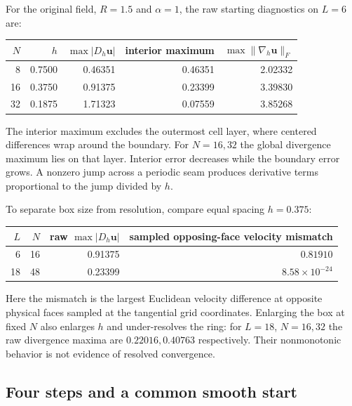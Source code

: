 \documentclass[11pt]{article}
\begin{document}
For the original field, $R=1.5$ and $\alpha=1$, the raw starting diagnostics
on $L=6$ are:
\begin{center}
\begin{tabular}{r r r r r}
\hline
$N$ & $h$ & $\max|D_h\mathbf u|$ &
interior maximum & $\max\|\nabla_h\mathbf u\|_F$\\
\hline
8  & 0.7500 & 0.46351 & 0.46351 & 2.02332\\
16 & 0.3750 & 0.91375 & 0.23399 & 3.39830\\
32 & 0.1875 & 1.71323 & 0.07559 & 3.85268\\
\hline
\end{tabular}
\end{center}
The interior maximum excludes the outermost cell layer, where centered
differences wrap around the boundary. For $N=16,32$ the global divergence
maximum lies on that layer. Interior error decreases while the boundary
error grows. A nonzero jump across a periodic seam produces derivative
terms proportional to the jump divided by $h$.

To separate box size from resolution, compare equal spacing $h=0.375$:
\begin{center}
\begin{tabular}{r r r r}
\hline
$L$ & $N$ & raw $\max|D_h\mathbf u|$ &
sampled opposing-face velocity mismatch\\
\hline
6  & 16 & 0.91375 & $0.81910$\\
18 & 48 & 0.23399 & $8.58\times10^{-24}$\\
\hline
\end{tabular}
\end{center}
Here the mismatch is the largest Euclidean velocity difference at opposite
physical faces sampled at the tangential grid coordinates. Enlarging the
box at fixed $N$ also enlarges $h$ and under-resolves the ring: for $L=18$,
$N=16,32$ the raw divergence maxima are $0.22016,0.40763$ respectively.
Their nonmonotonic behavior is not evidence of resolved convergence.

\subsection*{Four steps and a common smooth start}
\end{document}
